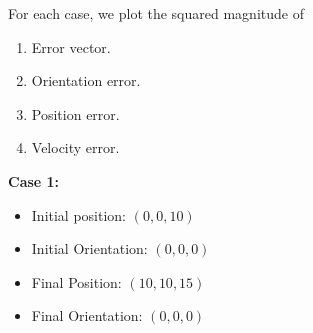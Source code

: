 \documentclass[12pt,fleqn]{article}
\begin{document}
For each case, we plot the squared magnitude of 
\begin{enumerate}
\item Error vector.
\item Orientation error.
\item Position error.
\item Velocity error.
\end{enumerate}
\newpage
\textbf{Case 1:}
\begin{itemize}
\item Initial position: $(0,0,10)$
\item Initial Orientation: $(0,0,0)$
\item Final Position: $(10,10,15)$
\item Final Orientation: $(0,0,0)$
\end{itemize}
\end{document}
